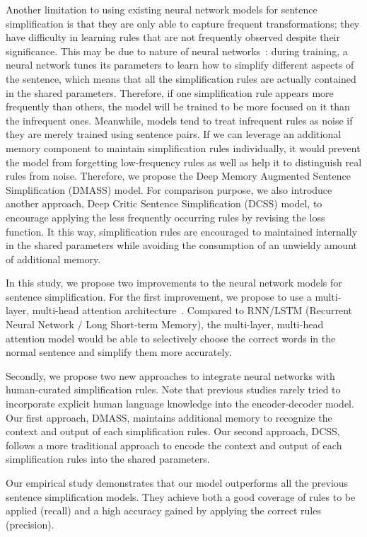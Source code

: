 \documentclass[11pt,a4paper]{article}
\begin{document}
Another limitation to using existing neural network models for sentence simplification is that they are only able to capture frequent transformations; they have difficulty in learning rules that are not frequently observed despite their significance. This may be due to nature of neural networks~\cite{feng2017memory}: during training, a neural network tunes its parameters to learn how to simplify different aspects of the sentence, which means that all the simplification rules are actually contained in the shared parameters. Therefore, if one simplification rule appears more frequently than others, the model will be trained to be more focused on it than the infrequent ones. Meanwhile, models tend to treat infrequent rules as noise if they are merely trained using sentence pairs. If we can leverage an additional memory component to maintain simplification rules individually, it would prevent the model from forgetting low-frequency rules as well as help it to distinguish real rules from noise. Therefore, we propose the Deep Memory Augmented Sentence Simplification (DMASS) model. 
For comparison purpose, we also introduce another approach, Deep Critic Sentence Simplification (DCSS) model, to encourage applying the less frequently occurring rules by revising the loss function.
It this way, simplification rules are encouraged to maintained internally in the shared parameters while avoiding the consumption of an unwieldy amount of additional memory.

In this study, we propose two improvements to the neural network models for sentence simplification. For the first improvement, we propose to use a multi-layer, multi-head attention architecture~\cite{vaswani2017attention}. Compared to RNN/LSTM (Recurrent Neural Network / Long Short-term Memory), the multi-layer, multi-head attention model would be able to selectively choose the correct words in the normal sentence and simplify them more accurately. 

Secondly, we propose two new approaches to integrate neural networks with human-curated simplification rules. Note that previous studies rarely tried to incorporate explicit human language knowledge into the encoder-decoder model.
Our first approach, DMASS, maintains additional memory to recognize the context and output of each simplification rules. Our second approach, DCSS, follows a more traditional approach to encode the context and output of each simplification rules into the shared parameters.

Our empirical study demonstrates that our model outperforms all the previous sentence simplification models. 
They achieve both a good coverage of rules to be applied (recall) and a high accuracy gained by applying the correct rules (precision).
\end{document}
